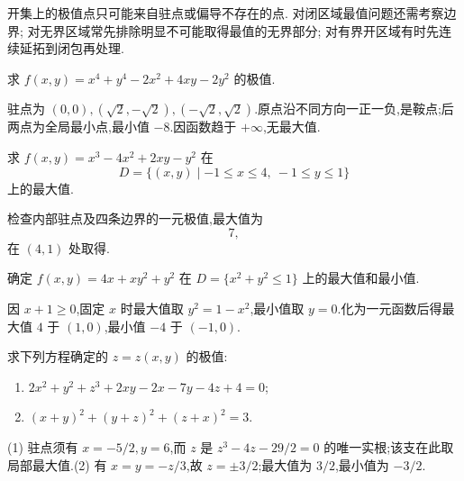 \begin{remark}
    开集上的极值点只可能来自驻点或偏导不存在的点. 对闭区域最值问题还需考察边界; 对无界区域常先排除明显不可能取得最值的无界部分; 对有界开区域有时先连续延拓到闭包再处理.
\end{remark}

\begin{example}
    求 $f(x,y)=x^4+y^4-2x^2+4xy-2y^2$ 的极值.
\end{example}
\exampleblank

\begin{solution}
    驻点为 $(0,0),(\sqrt{2},-\sqrt{2}),(-\sqrt{2},\sqrt{2})$.原点沿不同方向一正一负,是鞍点;后两点为全局最小点,最小值 $-8$.因函数趋于 $+\infty$,无最大值.
\end{solution}

\begin{example}
    求 $f(x,y)=x^3-4x^2+2xy-y^2$ 在
    \[
        D=\{(x,y)\mid -1\leq x\leq4,\ -1\leq y\leq1\}
    \]
    上的最大值.
\end{example}
\exampleblank

\begin{solution}
    检查内部驻点及四条边界的一元极值,最大值为
    \[
        7,
    \]
    在 $(4,1)$ 处取得.
\end{solution}

\begin{example}
    确定 $f(x,y)=4x+xy^2+y^2$ 在 $D=\{x^2+y^2\leq1\}$ 上的最大值和最小值.
\end{example}
\exampleblank

\begin{solution}
    因 $x+1\geq0$,固定 $x$ 时最大值取 $y^2=1-x^2$,最小值取 $y=0$.化为一元函数后得最大值 $4$ 于 $(1,0)$,最小值 $-4$ 于 $(-1,0)$.
\end{solution}

\begin{example}
    求下列方程确定的 $z=z(x,y)$ 的极值:
    \begin{enumerate}
        \item $2x^2+y^2+z^3+2xy-2x-7y-4z+4=0$;
        \item $(x+y)^2+(y+z)^2+(z+x)^2=3$.
    \end{enumerate}
\end{example}
\exampleblank

\begin{solution}
    (1) 驻点须有 $x=-5/2,y=6$,而 $z$ 是 $z^3-4z-29/2=0$ 的唯一实根;该支在此取局部最大值.(2) 有 $x=y=-z/3$,故 $z=\pm3/2$;最大值为 $3/2$,最小值为 $-3/2$.
\end{solution}

